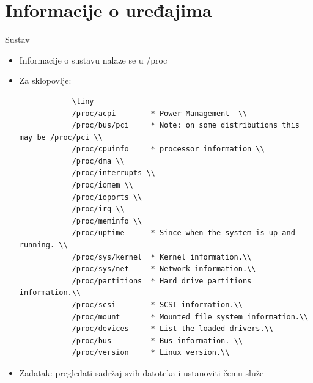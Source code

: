 \documentclass[croatian,t]{beamer} %
\begin{document}
	\section{Informacije o uređajima}
	\begin{frame}{Sustav}
		\begin{itemize}
			\item Informacije o sustavu nalaze se u /proc
			\item Za sklopovlje:
		\begin{verbatim}
			\tiny
			/proc/acpi        * Power Management  \\
			/proc/bus/pci     * Note: on some distributions this may be /proc/pci \\
			/proc/cpuinfo     * processor information \\
			/proc/dma \\
			/proc/interrupts \\
			/proc/iomem \\
			/proc/ioports \\
			/proc/irq \\
			/proc/meminfo \\
			/proc/uptime      * Since when the system is up and running. \\
			/proc/sys/kernel  * Kernel information.\\
			/proc/sys/net     * Network information.\\
			/proc/partitions  * Hard drive partitions information.\\
			/proc/scsi        * SCSI information.\\
			/proc/mount       * Mounted file system information.\\
			/proc/devices     * List the loaded drivers.\\
			/proc/bus         * Bus information. \\
			/proc/version     * Linux version.\\
		\end{verbatim}
			\item Zadatak: pregledati sadržaj svih datoteka i ustanoviti čemu služe
		\end{itemize}
	\end{frame}
	
\end{document}

